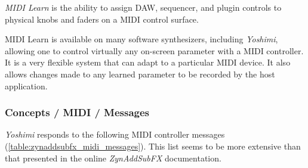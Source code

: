    \textsl{MIDI Learn} is
   the ability to assign DAW, sequencer, and plugin controls to physical
   knobs and faders on a MIDI control surface.

   MIDI Learn is available on many software synthesizers, including
   \textsl{Yoshimi}, allowing one to control virtually any on-screen parameter
   with a MIDI controller. It is a very flexible system that can adapt to a
   particular MIDI device.  It also allows changes made to any learned
   parameter to be recorded by the host application.

\subsubsection{Concepts / MIDI / Messages}
\label{subsubsec:concepts_midi_messages}

   \textsl{Yoshimi} responds to the following MIDI controller messages
   (\ref{table:zynaddsubfx_midi_messages}).
   This list seems to be more extensive than that presented in the
   online \textsl{ZynAddSubFX} documentation.

